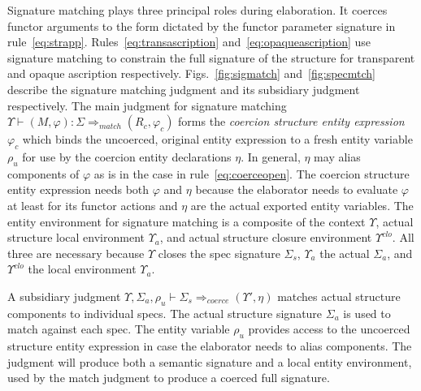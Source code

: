 Signature matching plays three principal roles during elaboration. It
coerces functor arguments to the form dictated by the functor
parameter signature in
rule~\ref{eq:strapp}. Rules~\ref{eq:transascription}
and~\ref{eq:opaqueascription} use signature matching to constrain the
full signature of the structure for transparent and opaque ascription
respectively. Figs.~\ref{fig:sigmatch} and~\ref{fig:specmtch} describe 
the signature matching judgment and its subsidiary judgment respectively. The main judgment for signature matching $\Upsilon\vdash(M,\varphi):\Sigma\Rightarrow_{match} (R_c,\varphi_c)$ forms the \emph{coercion structure entity expression} $\varphi_c$ which binds the uncoerced, original entity expression to a fresh entity variable $\rho_u$ for use by the coercion entity declarations $\eta$. In general, $\eta$ may alias components of $\varphi$ as is in the case in rule~\ref{eq:coerceopen}.  The coercion structure entity expression needs both $\varphi$ and $\eta$ because the elaborator needs to evaluate $\varphi$ at least for its functor actions and $\eta$ are the actual exported entity variables. The entity environment for signature matching is a composite of the context $\Upsilon$, actual structure local environment $\Upsilon_a$, and actual structure closure environment $\Upsilon^{clo}$. All three are necessary because $\Upsilon$ closes the spec signature $\Sigma_s$, $\Upsilon_a$ the actual $\Sigma_a$, and $\Upsilon^{clo}$ the local environment $\Upsilon_a$. 

A subsidiary judgment $\Upsilon,\Sigma_a,\rho_u\vdash \Sigma_s \Rightarrow_{coerce} (\Upsilon', \eta)$ matches actual structure components to individual specs. The actual structure signature $\Sigma_a$ is used to match against each spec. The entity variable $\rho_u$ provides access to the uncoerced structure entity expression in case the elaborator needs to alias components. The judgment will produce both a semantic signature and a local entity environment, used by the match judgment to produce a coerced full signature. 

